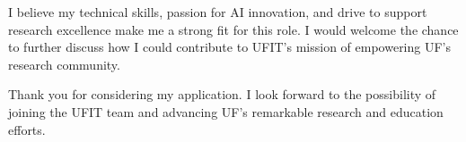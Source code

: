 \documentclass[11pt, letterpaper]{awesome-cv}
\begin{document}
\begin{cvletter}
  I believe my technical skills, passion for AI innovation, and drive to support research excellence make me a strong fit for this role. I would welcome the chance to further discuss how I could contribute to UFIT's mission of empowering UF's research community.

  Thank you for considering my application. I look forward to the possibility of joining the UFIT team and advancing UF's remarkable research and education efforts.
\end{cvletter}


\makeletterclosing
\end{document}
